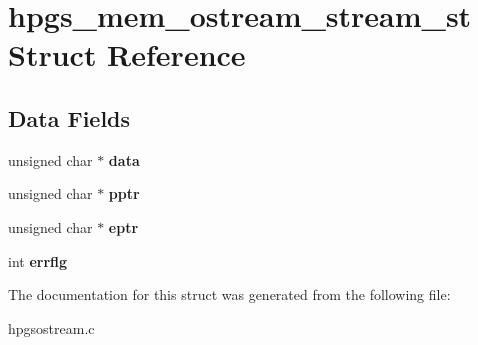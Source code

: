 \section{hpgs\_\-mem\_\-ostream\_\-stream\_\-st Struct Reference}
\label{structhpgs__mem__ostream__stream__st}
\subsection*{Data Fields}
\begin{DoxyCompactItemize}
\item 
unsigned char $\ast$ {\bfseries data}\label{structhpgs__mem__ostream__stream__st_a2a3898548c8bef66796b3b595d297d63}

\item 
unsigned char $\ast$ {\bfseries pptr}\label{structhpgs__mem__ostream__stream__st_ac74393706b165146122e77af5e9a759f}

\item 
unsigned char $\ast$ {\bfseries eptr}\label{structhpgs__mem__ostream__stream__st_a98836997d9b5df557f71c1072c1ac92f}

\item 
int {\bfseries errflg}\label{structhpgs__mem__ostream__stream__st_a6f74b0581946d27946a96cc71d1162e9}

\end{DoxyCompactItemize}


The documentation for this struct was generated from the following file:\begin{DoxyCompactItemize}
\item 
hpgsostream.c\end{DoxyCompactItemize}
